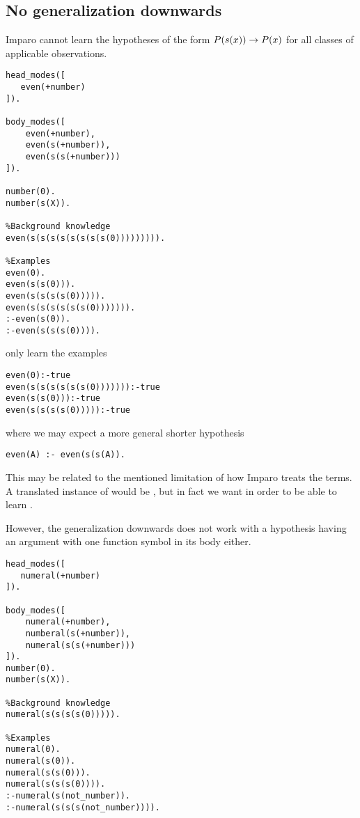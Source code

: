 \subsection{No generalization downwards}
Imparo cannot learn the hypotheses of the form $P(s(x)) \to P(x)$ for all classes of applicable observations.

\begin{lstlisting}
head_modes([
   even(+number)
]).

body_modes([
    even(+number),
    even(s(+number)),
    even(s(s(+number)))
]).

number(0).
number(s(X)).

%Background knowledge
even(s(s(s(s(s(s(s(s(0))))))))).

%Examples
even(0).
even(s(s(0))).
even(s(s(s(s(0))))).
even(s(s(s(s(s(s(0))))))).
:-even(s(0)).
:-even(s(s(s(0)))).
\end{lstlisting}

only learn the examples

\begin{lstlisting}
even(0):-true
even(s(s(s(s(s(s(0))))))):-true
even(s(s(0))):-true
even(s(s(s(s(0))))):-true
\end{lstlisting}

where we may expect a more general shorter hypothesis

\begin{lstlisting}
even(A) :- even(s(s(A)).
\end{lstlisting}
This may be related to the mentioned limitation of how Imparo treats the terms. A translated instance of  would be
, but in fact we want  in order to be able to learn
.

However, the generalization downwards does not work with a hypothesis having an argument with one function symbol in its body either.

\begin{lstlisting}
head_modes([
   numeral(+number)
]).

body_modes([
    numeral(+number),
    numberal(s(+number)),
    numeral(s(s(+number)))
]).
number(0).
number(s(X)).

%Background knowledge
numeral(s(s(s(s(0))))).

%Examples
numeral(0).
numeral(s(0)).
numeral(s(s(0))).
numeral(s(s(s(0)))).
:-numeral(s(not_number)).
:-numeral(s(s(s(not_number)))).                                   
\end{lstlisting}

